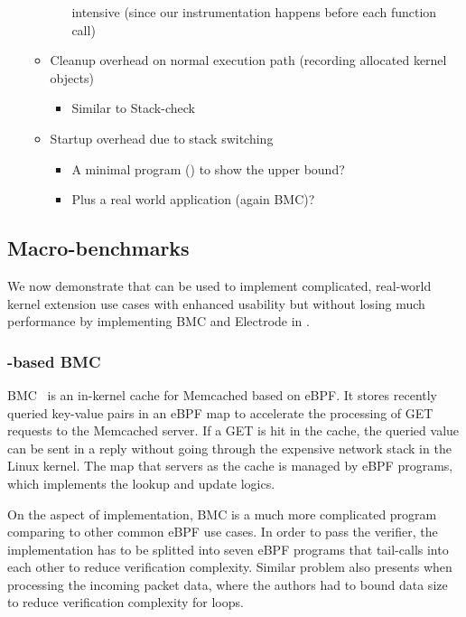 \begin{itemize}
\begin{itemize}
\begin{itemize}
                        intensive (since our instrumentation happens before
                        each function call)
                \end{itemize}
            \item Cleanup overhead on normal execution path (recording
                allocated kernel objects)
                \begin{itemize}
                    \item Similar to Stack-check
                \end{itemize}
            \item Startup overhead due to stack switching
                \begin{itemize}
                    \item A minimal program () to show the upper bound?
                    \item Plus a real world application (again BMC)?
                \end{itemize}
        \end{itemize}
\end{itemize}

\subsection{Macro-benchmarks}
We now demonstrate that \projname{} can be used to implement complicated,
    real-world kernel extension use cases with enhanced usability but without
    losing much performance by implementing BMC and Electrode in \projname{}.

\subsubsection{\projname{}-based BMC}
%

BMC~\cite{BMC} is an in-kernel cache for Memcached based on eBPF.
It stores recently queried key-value pairs in an eBPF map to accelerate the
    processing of GET requests to the Memcached server.
If a GET is hit in the cache, the queried value can be sent in a reply without
    going through the expensive network stack in the Linux kernel.
The map that servers as the cache is managed by eBPF programs, which implements
    the lookup and update logics.

On the aspect of implementation, BMC is a much more complicated program
    comparing to other common eBPF use cases.
In order to pass the verifier, the implementation has to be splitted into seven
    eBPF programs that tail-calls into each other to reduce verification
    complexity.
Similar problem also presents when processing the incoming packet data, where
    the authors had to bound data size to reduce verification complexity for
    loops.

